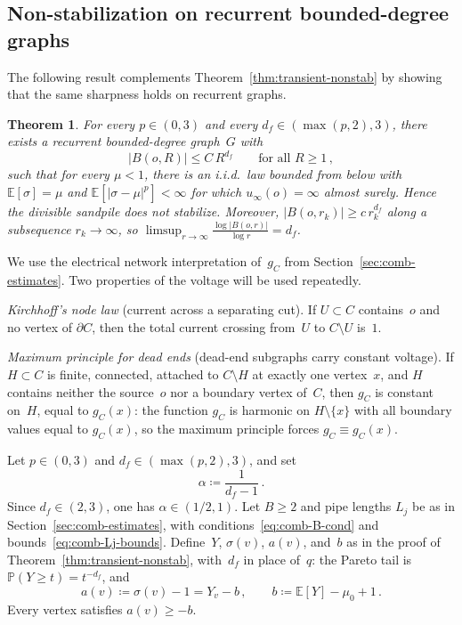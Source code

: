 \documentclass[11pt]{amsart}
\theoremstyle{plain}
\newtheorem{theorem}{Theorem}[section]
\theoremstyle{definition}
\newcommand{\E}{\mathbb{E}}
\renewcommand{\P}{\mathbb{P}}
\begin{document}
	
	\subsection{Non-stabilization on recurrent bounded-degree graphs}\label{sec:recurrent-nonstab}
	
	The following result complements Theorem~\ref{thm:transient-nonstab} by showing that the same sharpness holds on recurrent graphs.
	
	\begin{theorem}\label{thm:recurrent-nonstab}
		For every $p\in(0,3)$ and every $d_f\in(\max(p,2),3)$, there exists a recurrent bounded-degree graph~$G$ with
		\begin{equation}
			|B(o,R)|\leq C\,R^{d_f}
			\qquad\text{for all } R\geq 1\,,
		\end{equation}
		such that for every $\mu<1$, there is an i.i.d.\ law bounded from below with $\E[\sigma]=\mu$ and $\E[|\sigma-\mu|^p]<\infty$ for which $u_\infty(o)=\infty$ almost surely. Hence the divisible sandpile does not stabilize.
		Moreover, $|B(o,r_k)|\geq c\,r_k^{d_f}$ along a subsequence $r_k\to\infty$, so $\limsup_{r\to\infty}\frac{\log|B(o,r)|}{\log r}=d_f$.
	\end{theorem}
	
	We use the electrical network interpretation of~$g_C$ from Section~\ref{sec:comb-estimates}.  Two properties of the voltage will be used repeatedly.
	
	\emph{Kirchhoff's node law} (current across a separating cut).  If $U\subset C$ contains~$o$ and no vertex of $\partial C$, then the total current crossing from~$U$ to $C\setminus U$ is~$1$.
	
	\emph{Maximum principle for dead ends} (dead-end subgraphs carry constant voltage).  If $H\subset C$ is finite, connected, attached to $C\setminus H$ at exactly one vertex~$x$, and $H$ contains neither the source~$o$ nor a boundary vertex of~$C$, then $g_C$ is constant on~$H$, equal to $g_C(x)$: the function $g_C$ is harmonic on $H\setminus\{x\}$ with all boundary values equal to $g_C(x)$, so the maximum principle \citep[Section~2.1]{LP16} forces $g_C\equiv g_C(x)$.
	
	Let $p\in(0,3)$ and $d_f\in(\max(p,2),3)$, and set
	\begin{equation}
		\alpha\coloneqq\frac{1}{d_f-1}\,.
	\end{equation}
	Since $d_f\in(2,3)$, one has $\alpha\in(1/2,1)$.  Let $B\geq 2$ and pipe lengths $L_j$ be as in Section~\ref{sec:comb-estimates}, with conditions~\eqref{eq:comb-B-cond} and bounds~\eqref{eq:comb-Lj-bounds}.
	Define~$Y$, $\sigma(v)$, $a(v)$, and~$b$ as in the proof of Theorem~\ref{thm:transient-nonstab}, with~$d_f$ in place of~$q$: the Pareto tail is~$\P(Y\geq t)=t^{-d_f}$, and
	\begin{equation}\label{eq:rec-ab}
		a(v)\coloneqq\sigma(v)-1=Y_v-b\,,
		\qquad
		b\coloneqq\E[Y]-\mu_0+1\,.
	\end{equation}
	Every vertex satisfies $a(v)\geq -b$.
	
\end{document}
